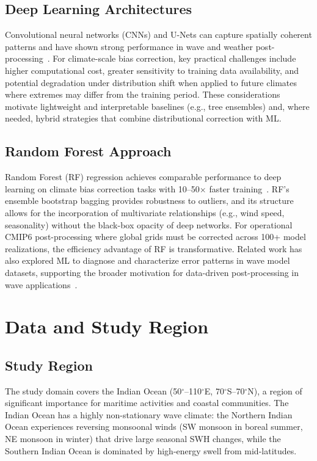 \documentclass[conference]{IEEEtran}
\begin{document}
\subsection{Deep Learning Architectures}
Convolutional neural networks (CNNs) and U-Nets can capture spatially coherent patterns and have shown strong performance in wave and weather post-processing~\cite{sun2022}. For climate-scale bias correction, key practical challenges include higher computational cost, greater sensitivity to training data availability, and potential degradation under distribution shift when applied to future climates where extremes may differ from the training period. These considerations motivate lightweight and interpretable baselines (e.g., tree ensembles) and, where needed, hybrid strategies that combine distributional correction with ML.

\subsection{Random Forest Approach}
Random Forest (RF) regression achieves comparable performance to deep learning on climate bias correction tasks with 10--50$\times$ faster training~\cite{breiman2001}. RF's ensemble bootstrap bagging provides robustness to outliers, and its structure allows for the incorporation of multivariate relationships (e.g., wind speed, seasonality) without the black-box opacity of deep networks. For operational CMIP6 post-processing where global grids must be corrected across 100+ model realizations, the efficiency advantage of RF is transformative. Related work has also explored ML to diagnose and characterize error patterns in wave model datasets, supporting the broader motivation for data-driven post-processing in wave applications~\cite{ellenson2020}.

\section{Data and Study Region}

\subsection{Study Region}
The study domain covers the Indian Ocean (50$^{\circ}$--110$^{\circ}$E, 70$^{\circ}$S--70$^{\circ}$N), a region of significant importance for maritime activities and coastal communities. The Indian Ocean has a highly non-stationary wave climate: the Northern Indian Ocean experiences reversing monsoonal winds (SW monsoon in boreal summer, NE monsoon in winter) that drive large seasonal SWH changes, while the Southern Indian Ocean is dominated by high-energy swell from mid-latitudes.
\end{document}
